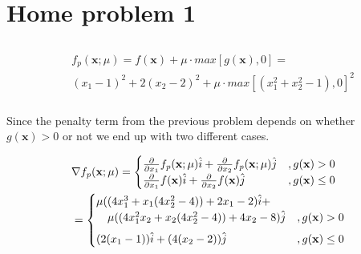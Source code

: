 \documentclass{article}
\begin{document}
\section{Home problem 1}
\subsection{}
\subsubsection{}

\begin{align*}
  &f_\mathit{p}(\mathbf{x}; \mu) = f(\mathbf{x}) + \mu \cdot max \left[ g(\mathbf{x}), 0 \right]  = \\
  &(x_1 - 1)^2 + 2(x_2 - 2)^2 + \mu \cdot max \left[ (x_1^2 + x_2^2 - 1 ), 0 \right]^2
\end{align*}

\subsubsection{}

Since the penalty term from the previous problem depends on whether
$g(\mathbf{x}) > 0$ or not we end up with two different cases.

\begin{align*}
  & \nabla f_\mathit{p}(\mathbf{x}; \mu) =
  \begin{cases}
    \frac{\partial}{\partial x_1}f_\mathit{p}(\mathbf{x}; \mu) \hat{i} +
    \frac{\partial}{\partial x_2}f_\mathit{p}(\mathbf{x}; \mu) \hat{j} &,g(\mathbf{x}) > 0 \\
    \frac{\partial}{\partial x_1}f(\mathbf{x}) \hat{i} +
    \frac{\partial}{\partial x_2}f(\mathbf{x}) \hat{j} &,g(\mathbf{x}) \leq 0 \\
  \end{cases} \\
  & =
  \begin{cases}
    \mu ((4 x_1^3 + x_1 (4 x_2^2-4))+2 x_1-2) \hat{i} + \\
    \hspace{1em} \mu ((4 x_1^2 x_2+x_2 (4 x_2^2-4))+4 x_2-8) \hat{j} &,\vspace{0.5em}g(\mathbf{x}) > 0 \\
    (2 (x_1 - 1)) \hat{i} + (4 (x_2 - 2)) \hat{j} &,g(\mathbf{x}) \leq 0
  \end{cases}
\end{align*}
\end{document}
